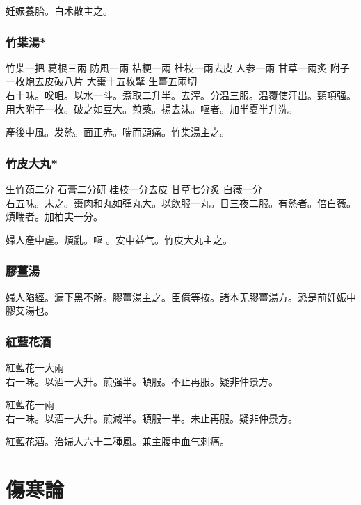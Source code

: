 妊娠養胎。白术散主之。

\section{竹枼湯*}

竹枼{\scriptsize 一把} 葛根{\scriptsize 三兩} 防風{\scriptsize 一兩} 桔梗{\scriptsize 一兩} 桂枝{\scriptsize 一兩去皮} 人参{\scriptsize 一兩} 甘草{\scriptsize 一兩炙} 附子{\scriptsize 一枚炮去皮破八片} 大棗{\scriptsize 十五枚擘} 生薑{\scriptsize 五兩切}\\
右十味。㕮咀。以水一斗。煮取二升半。去滓。分温三服。温覆使汗出。頸項强。用大附子一枚。破之如豆大。煎藥。揚去沫。嘔者。加半夏半升洗。

產後中風。发熱。面{\khaaitp 正}赤。喘而頭痛。竹枼湯主之。

\section{竹皮大丸*}

生竹茹{\scriptsize 二分} 石膏{\scriptsize 二分研} 桂枝{\scriptsize 一分去皮} 甘草{\scriptsize 七分炙} 白薇{\scriptsize 一分}\\
右五味。末之。棗肉和丸如彈丸大。以飲服一丸。日三夜二服。有熱者。倍白薇。煩喘者。加柏実一分。

婦人產中虗。煩亂。嘔{\sungtpii 𠱘}。安中益气。竹皮大丸主之。

\section{膠薑湯}

婦人陷經。漏下黑不解。膠薑湯主之。{\scriptsize 臣億等按。諸本无膠薑湯{\khaaitp 方}。恐是前妊娠中膠艾湯也。}

\section{紅藍花酒}

紅藍花{\scriptsize 一大兩}\\
右一味。以酒一大升。煎强半。頓服。不止再服。{\scriptsize 疑非仲景方。}{\wuben}

紅藍花{\scriptsize 一兩}\\
右一味。以酒一大升。煎減半。頓服一半。未止再服。{\scriptsize 疑非仲景方。}{\dengben}

紅藍花酒。治婦人六十二種風。兼主腹中血气刺痛。

\part{傷寒論}


